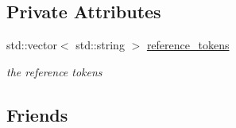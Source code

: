 \subsection*{Private Attributes}
\begin{DoxyCompactItemize}
\item 
std\+::vector$<$ std\+::string $>$ \hyperlink{classnlohmann_1_1json__pointer_a07a990a6838de4f38ee9d881e7b9fd61}{reference\+\_\+tokens}
\begin{DoxyCompactList}\small\item\em the reference tokens \end{DoxyCompactList}\end{DoxyCompactItemize}
\subsection*{Friends}

